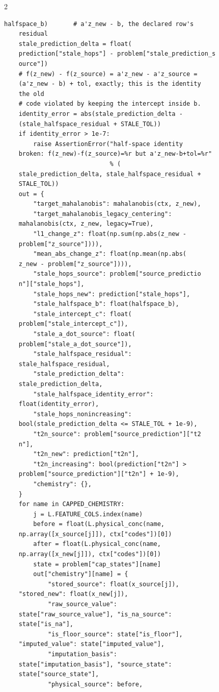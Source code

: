 \begin{multicols}{2}
\begin{Verbatim}[fontsize=\scriptsize]
    halfspace_b)       # a'z_new - b, the declared row's
    residual
    stale_prediction_delta = float(
    prediction["stale_hops"] - problem["stale_prediction_s
    ource"])
    # f(z_new) - f(z_source) = a'z_new - a'z_source =
    (a'z_new - b) + tol, exactly; this is the identity
    the old
    # code violated by keeping the intercept inside b.
    identity_error = abs(stale_prediction_delta -
    (stale_halfspace_residual + STALE_TOL))
    if identity_error > 1e-7:
        raise AssertionError("half-space identity
    broken: f(z_new)-f(z_source)=%r but a'z_new-b+tol=%r"
                             % (
    stale_prediction_delta, stale_halfspace_residual +
    STALE_TOL))
    out = {
        "target_mahalanobis": mahalanobis(ctx, z_new),
        "target_mahalanobis_legacy_centering":
    mahalanobis(ctx, z_new, legacy=True),
        "l1_change_z": float(np.sum(np.abs(z_new -
    problem["z_source"]))),
        "mean_abs_change_z": float(np.mean(np.abs(
    z_new - problem["z_source"]))),
        "stale_hops_source": problem["source_predictio
    n"]["stale_hops"],
        "stale_hops_new": prediction["stale_hops"],
        "stale_halfspace_b": float(halfspace_b),
        "stale_intercept_c": float(
    problem["stale_intercept_c"]),
        "stale_a_dot_source": float(
    problem["stale_a_dot_source"]),
        "stale_halfspace_residual":
    stale_halfspace_residual,
        "stale_prediction_delta":
    stale_prediction_delta,
        "stale_halfspace_identity_error":
    float(identity_error),
        "stale_hops_nonincreasing":
    bool(stale_prediction_delta <= STALE_TOL + 1e-9),
        "t2n_source": problem["source_prediction"]["t2
    n"],
        "t2n_new": prediction["t2n"],
        "t2n_increasing": bool(prediction["t2n"] >
    problem["source_prediction"]["t2n"] + 1e-9),
        "chemistry": {},
    }
    for name in CAPPED_CHEMISTRY:
        j = L.FEATURE_COLS.index(name)
        before = float(L.physical_conc(name,
    np.array([x_source[j]]), ctx["codes"])[0])
        after = float(L.physical_conc(name,
    np.array([x_new[j]]), ctx["codes"])[0])
        state = problem["cap_states"][name]
        out["chemistry"][name] = {
            "stored_source": float(x_source[j]),
    "stored_new": float(x_new[j]),
            "raw_source_value":
    state["raw_source_value"], "is_na_source":
    state["is_na"],
            "is_floor_source": state["is_floor"],
    "imputed_value": state["imputed_value"],
            "imputation_basis":
    state["imputation_basis"], "source_state":
    state["source_state"],
            "physical_source": before,

\end{Verbatim}
\end{multicols}
